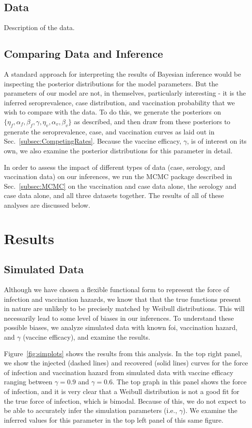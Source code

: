 \documentclass[nofootinbib,aps,pre,twocolumn,superscriptaddress,showkeys,showpacs]{revtex4-1}
\begin{document}
\subsection{Data \label{subsec:Data}}
Description of the data. 

\subsection{Comparing Data and Inference \label{subsec:Comp}}
A standard approach for interpreting the results of Bayesian inference would be inspecting the posterior distributions for the model parameters. But the parameters of our model are not, in themselves, particularly interesting - it is the inferred seroprevalence, case distribution, and vaccination probability that we wish to compare with the data. To do this, we generate the posteriors on $\{\eta_f, \alpha_f, \beta_f, \gamma, \eta_v, \alpha_v, \beta_v\}$ as described, and then draw from these posteriors to generate the seroprevalence, case, and vaccination curves as laid out in Sec.~\ref{subsec:CompetingRates}. Because the vaccine efficacy, $\gamma$, is of interest on its own, we also examine the posterior distributions for this parameter in detail.

In order to assess the impact of different types of data (case, serology, and vaccination data) on our inferences, we run the MCMC package described in Sec.~\ref{subsec:MCMC} on the vaccination and case data alone, the serology and case data alone, and all three datasets together. The results of all of these analyses are discussed below.

\section{Results \label{sec:Results}}
\subsection{Simulated Data \label{subsec:SimDat}}
Although we have chosen a flexible functional form to represent the force of infection and vaccination hazards, we know that that the true functions present in nature are unlikely to be precisely matched by Weibull distributions. This will necessarily lead to some level of biases in our inferences. To understand these possible biases, we analyze simulated data with known foi, vaccination hazard, and $\gamma$ (vaccine efficacy), and examine the results.  

Figure~\ref{fig:simplots} shows the results from this analysis. In the top right panel, we show the injected (dashed lines) and recovered (solid lines) curves for the force of infection and vaccination hazard from simulated data with vaccine efficacy ranging between $\gamma = 0.9$  and $\gamma = 0.6$. The top graph in this panel shows the force of infection, and it is very clear that a Weibull distribution is not a good fit for the true force of infection, which is bimodal.  Because of this, we do not expect to be able to accurately infer the simulation parameters (i.e., $\gamma$). We examine the inferred values for this parameter in the top left panel of this same figure. 
\end{document}
